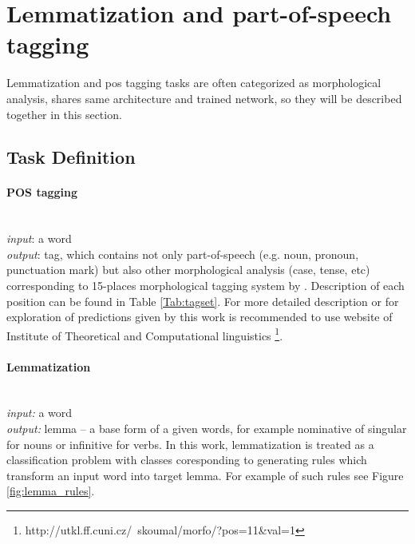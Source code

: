 \section{Lemmatization and part-of-speech tagging}
\label{chap:tag}
Lemmatization and \acrlong{pos} tagging tasks are often categorized as morphological analysis, shares same architecture and trained network, so they will be described together in this section.
\subsection{Task Definition}

\paragraph{\textbf{POS tagging}} \mbox{}\\
\textit{input}: a word \\
\textit{output}: tag, which contains not only part-of-speech (e.g. noun, pronoun, punctuation mark) but also other morphological analysis (case, tense, etc) corresponding to 15-places morphological tagging system by \cite{Hajic2004}. Description of each position can be found in Table \ref{Tab:tagset}. For more detailed  description or for exploration of predictions given by this work is recommended to use website of Institute of Theoretical and Computational linguistics \footnote{http://utkl.ff.cuni.cz/~skoumal/morfo/?pos=11&val=1}.

\paragraph{\textbf{Lemmatization}} \mbox{}\\
\textit{input:} a word \\
\textit{output:} lemma -- a base form of a given words, for example nominative of singular for nouns or infinitive for verbs. In this work, lemmatization is treated as a classification problem with classes coresponding to generating rules which transform an input word into target lemma. For example of such rules see Figure \ref{fig:lemma_rules}. \\ %




